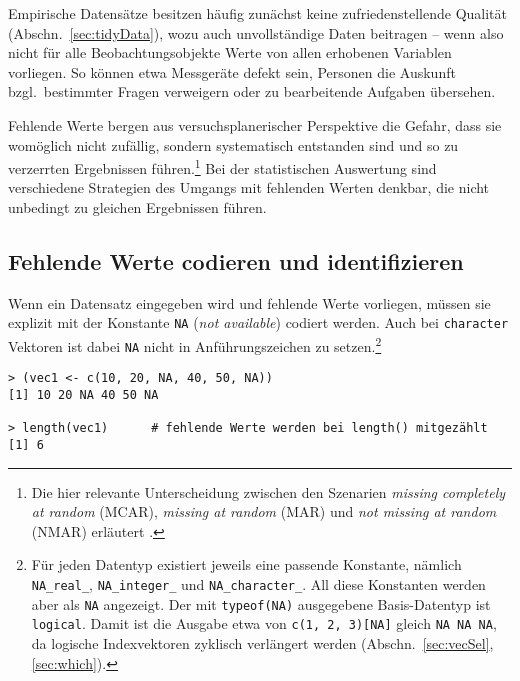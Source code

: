 Empirische Datensätze besitzen häufig zunächst keine zufriedenstellende Qualität (Abschn.\ \ref{sec:tidyData}), wozu auch unvollständige Daten beitragen -- wenn also nicht für alle Beobachtungsobjekte Werte von allen erhobenen Variablen vorliegen. So können etwa Messgeräte defekt sein, Personen die Auskunft bzgl.\ bestimmter Fragen verweigern oder zu bearbeitende Aufgaben übersehen.

Fehlende Werte bergen aus versuchsplanerischer Perspektive die Gefahr, dass sie womöglich nicht zufällig, sondern systematisch entstanden sind und so zu verzerrten Ergebnissen führen.\footnote{Die hier relevante Unterscheidung zwischen den Szenarien \emph{missing completely at random} (MCAR), \emph{missing at random} (MAR) und \emph{not missing at random} (NMAR) erläutert .} Bei der statistischen Auswertung sind verschiedene Strategien des Umgangs mit fehlenden Werten denkbar, die nicht unbedingt zu gleichen Ergebnissen führen.

\subsection{Fehlende Werte codieren und identifizieren}
\label{sec:isna}

Wenn ein Datensatz eingegeben wird und fehlende Werte vorliegen, müssen sie explizit mit der Konstante \lstinline!NA! (\emph{not available}) codiert werden. Auch bei \lstinline!character! Vektoren ist dabei \lstinline!NA! nicht in Anführungszeichen zu setzen.\footnote{\label{ftn:na_type}Für jeden Datentyp existiert jeweils eine passende Konstante, nämlich \lstinline!NA_real_!, \lstinline!NA_integer_! und \lstinline!NA_character_!. All diese Konstanten werden aber als \lstinline!NA! angezeigt. Der mit \lstinline!typeof(NA)! ausgegebene Basis-Datentyp ist \lstinline!logical!. Damit ist die Ausgabe etwa von \lstinline!c(1, 2, 3)[NA]! gleich \lstinline!NA NA NA!, da logische Indexvektoren zyklisch verlängert werden (Abschn.\ \ref{sec:vecSel}, \ref{sec:which}).}
\begin{lstlisting}
> (vec1 <- c(10, 20, NA, 40, 50, NA))
[1] 10 20 NA 40 50 NA

> length(vec1)      # fehlende Werte werden bei length() mitgezählt
[1] 6
\end{lstlisting}

